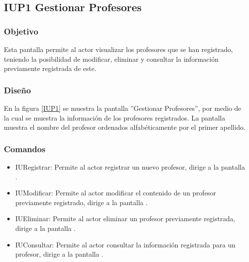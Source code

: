 \subsection{IUP1 Gestionar Profesores}

\subsubsection{Objetivo}
	
	Esta pantalla permite al actor visualizar los profesores que se han registrado, teniendo la posibilidad de modificar, eliminar y consultar la información previamente registrada de este.

\subsubsection{Diseño}

    En la figura \ref{IUP1} se muestra la pantalla ''Gestionar Profesores'', por medio de la cual se muestra la información de los profesores registrados. La pantalla muestra el nombre del profesor ordenados alfabéticamente por el primer apellido.
 

\subsubsection{Comandos}
    \begin{itemize}
		\item IURegistrar: Permite al actor registrar un nuevo profesor, dirige a la pantalla .
		
		\item IUModificar: Permite al actor modificar el contenido de un profesor previamente registrado, dirige a la pantalla .
		
		\item IUEliminar: Permite al actor eliminar un profesor previamente registrada, dirige a la pantalla .
	
		\item IUConsultar: Permite al actor consultar la información registrada para un profesor, dirige a la pantalla .
    \end{itemize}
